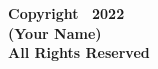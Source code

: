 
\thispagestyle{plain}
\setcounter{page}{3}
\begin{center}

\vspace*{\fill}
\linespread{1.2}
\Large{\textbf{Copyright \textcopyright \ 2022}}\\
\Large{\textbf{(Your Name)}}\\
\Large{\textbf{All Rights Reserved}}\\

\end{center}

\clearpage